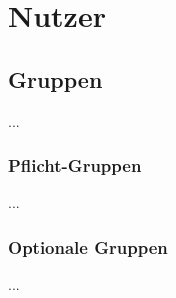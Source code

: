 %
%


\chapter{Nutzer}
\label{Nutzer}


\section{Gruppen}

...
\\


\subsection*{Pflicht-Gruppen}

...
\\


\subsection*{Optionale Gruppen}

...
\\


